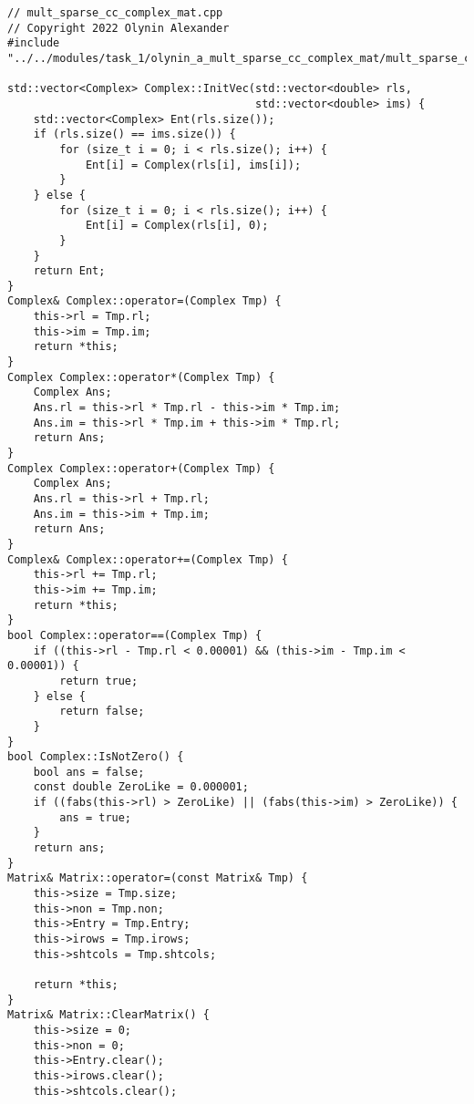 \documentclass[12pt]{report}
\begin{document}
\begin{lstlisting}
// mult_sparse_cc_complex_mat.cpp
// Copyright 2022 Olynin Alexander
#include "../../modules/task_1/olynin_a_mult_sparse_cc_complex_mat/mult_sparse_cc_complex_mat.h"

std::vector<Complex> Complex::InitVec(std::vector<double> rls,
                                      std::vector<double> ims) {
    std::vector<Complex> Ent(rls.size());
    if (rls.size() == ims.size()) {
        for (size_t i = 0; i < rls.size(); i++) {
            Ent[i] = Complex(rls[i], ims[i]);
        }
    } else {
        for (size_t i = 0; i < rls.size(); i++) {
            Ent[i] = Complex(rls[i], 0);
        }
    }
    return Ent;
}
Complex& Complex::operator=(Complex Tmp) {
    this->rl = Tmp.rl;
    this->im = Tmp.im;
    return *this;
}
Complex Complex::operator*(Complex Tmp) {
    Complex Ans;
    Ans.rl = this->rl * Tmp.rl - this->im * Tmp.im;
    Ans.im = this->rl * Tmp.im + this->im * Tmp.rl;
    return Ans;
}
Complex Complex::operator+(Complex Tmp) {
    Complex Ans;
    Ans.rl = this->rl + Tmp.rl;
    Ans.im = this->im + Tmp.im;
    return Ans;
}
Complex& Complex::operator+=(Complex Tmp) {
    this->rl += Tmp.rl;
    this->im += Tmp.im;
    return *this;
}
bool Complex::operator==(Complex Tmp) {
    if ((this->rl - Tmp.rl < 0.00001) && (this->im - Tmp.im < 0.00001)) {
        return true;
    } else {
        return false;
    }
}
bool Complex::IsNotZero() {
    bool ans = false;
    const double ZeroLike = 0.000001;
    if ((fabs(this->rl) > ZeroLike) || (fabs(this->im) > ZeroLike)) {
        ans = true;
    }
    return ans;
}
Matrix& Matrix::operator=(const Matrix& Tmp) {
    this->size = Tmp.size;
    this->non = Tmp.non;
    this->Entry = Tmp.Entry;
    this->irows = Tmp.irows;
    this->shtcols = Tmp.shtcols;

    return *this;
}
Matrix& Matrix::ClearMatrix() {
    this->size = 0;
    this->non = 0;
    this->Entry.clear();
    this->irows.clear();
    this->shtcols.clear();


\end{lstlisting}
\end{document}
